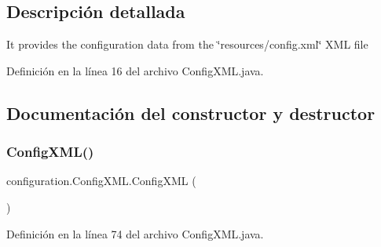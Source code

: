\subsection{Descripción detallada}
It provides the configuration data from the \char`\"{}resources/config.\+xml\char`\"{} X\+ML file 

Definición en la línea 16 del archivo Config\+X\+M\+L.\+java.



\subsection{Documentación del constructor y destructor}
\mbox{\label{classconfiguration_1_1ConfigXML_a0a848755f002c9c252612e188da0fee0}} 
\subsubsection{\texorpdfstring{ConfigXML()}{ConfigXML()}}
{\footnotesize\ttfamily configuration.\+Config\+X\+M\+L.\+Config\+X\+ML (\begin{DoxyParamCaption}{ }\end{DoxyParamCaption})\hspace{0.3cm}{\ttfamily [private]}}



Definición en la línea 74 del archivo Config\+X\+M\+L.\+java.



